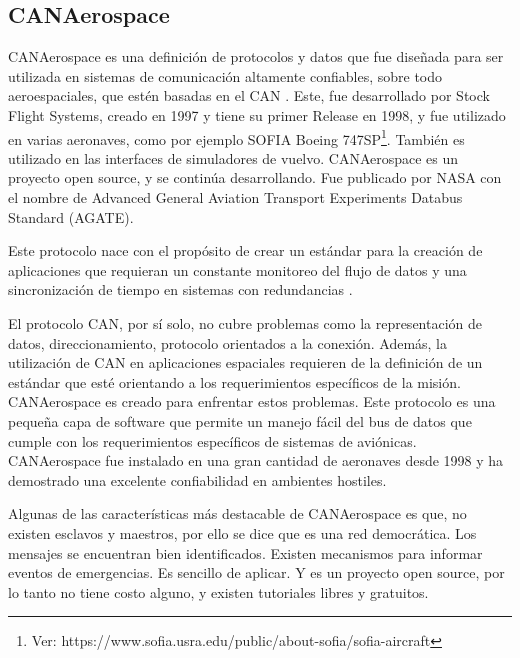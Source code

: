 \subsection{CANAerospace}
CANAerospace es una definición de protocolos y datos que fue diseñada
para ser utilizada en sistemas de comunicación altamente confiables,
sobre todo aeroespaciales, que estén basadas en el \ac{CAN}
\citep{CANAerospaceWEB}. Este, fue desarrollado por Stock Flight Systems,
creado en 1997 y tiene su primer Release en 1998, y fue utilizado en varias aeronaves,
como por ejemplo SOFIA Boeing 747SP\footnote{Ver: https://www.sofia.usra.edu/public/about-sofia/sofia-aircraft}.
También es utilizado en las interfaces de simuladores de vuelvo. 
CANAerospace es un proyecto open source, y se continúa desarrollando. Fue
publicado por NASA con el nombre de Advanced General Aviation Transport
Experiments Databus Standard (AGATE).

Este protocolo nace con el propósito de crear un estándar para la creación
de aplicaciones que requieran un constante monitoreo del flujo de datos y una
sincronización de tiempo en sistemas con redundancias \citep{CANAerospaceWEB}.


El protocolo CAN, por sí solo, no cubre problemas como la representación de datos,
direccionamiento, protocolo orientados a la conexión. Además, la utilización de CAN
en aplicaciones espaciales requieren de la definición de un estándar que esté
orientando a los requerimientos específicos de la misión. CANAerospace es creado
para enfrentar estos problemas. Este protocolo es una pequeña capa de software
que permite un manejo fácil del bus de datos que cumple con los requerimientos
específicos de sistemas de aviónicas. CANAerospace fue instalado en una gran cantidad
de aeronaves desde 1998 y ha demostrado  una excelente confiabilidad en
ambientes hostiles.

Algunas de las características más destacable de CANAerospace es que, no existen
esclavos y maestros, por ello se dice que es una red democrática. Los mensajes
se encuentran bien identificados. Existen mecanismos para informar eventos de
emergencias. Es sencillo de aplicar. Y  es un proyecto open source, por lo tanto
no tiene costo alguno, y existen tutoriales libres y gratuitos.

